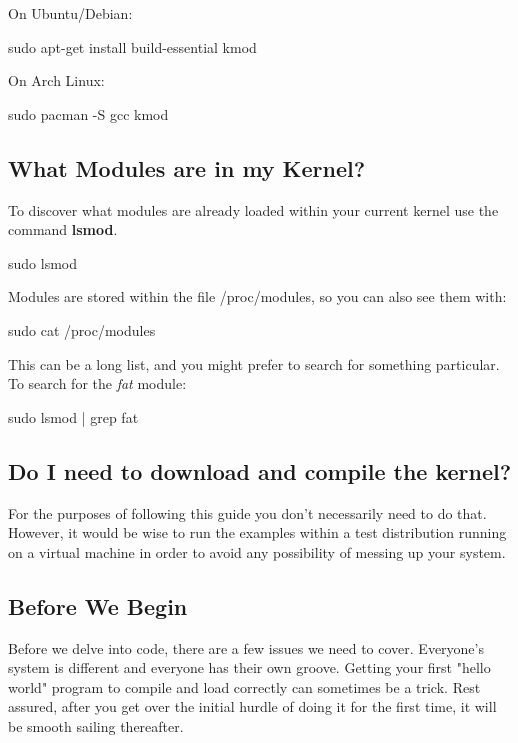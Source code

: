 \documentclass[10pt, oneside]{book}
\begin{document}
On Ubuntu/Debian:
\begin{codebash}
sudo apt-get install build-essential kmod
\end{codebash}

On Arch Linux:
\begin{codebash}
sudo pacman -S gcc kmod
\end{codebash}

\subsection{What Modules are in my Kernel?}
\label{sec:modutils}

To discover what modules are already loaded within your current kernel use the command \textbf{lsmod}.
\begin{codebash}
sudo lsmod
\end{codebash}

Modules are stored within the file /proc/modules, so you can also see them with:
\begin{codebash}
sudo cat /proc/modules
\end{codebash}

This can be a long list, and you might prefer to search for something particular.
To search for the \emph{fat} module:
\begin{codebash}
sudo lsmod | grep fat
\end{codebash}

\subsection{Do I need to download and compile the kernel?}
\label{sec:buildkernel}
For the purposes of following this guide you don't necessarily need to do that.
However, it would be wise to run the examples within a test distribution running on a virtual machine in order to avoid any possibility of messing up your system.

\subsection{Before We Begin}
\label{sec:preparation}
Before we delve into code, there are a few issues we need to cover.
Everyone's system is different and everyone has their own groove.
Getting your first "hello world" program to compile and load correctly can sometimes be a trick.
Rest assured, after you get over the initial hurdle of doing it for the first time, it will be smooth sailing thereafter.
\end{document}
